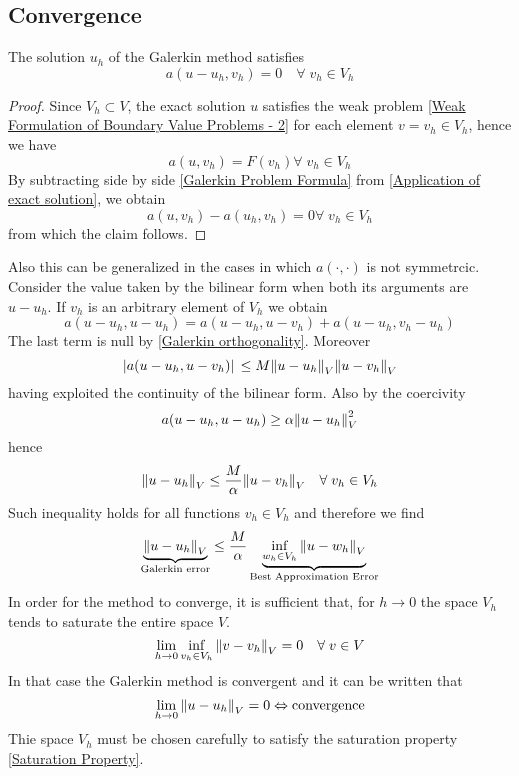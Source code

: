 \subsection*{Convergence}
\begin{lemma}
    The solution \(u_h\) of the Galerkin method satisfies 
    \begin{equation}
        a(u-u_h, v_h) = 0 \quad \forall \; v_h \in V_h \label{Galerkin orthogonality}
    \end{equation}
\end{lemma}
\begin{proof}
    Since \(V_h \subset V\), the exact solution \(u\) satisfies the weak problem \eqref{Weak Formulation of Boundary Value Problems - 2} for each element \(v = v_h \in V_h\), hence we have 
    \begin{equation}
        a(u, v_h) = F(v_h) \forall \; v_h \in V_h \label{Application of exact solution}
    \end{equation}
    By subtracting side by side \eqref{Galerkin Problem Formula} from \eqref{Application of exact solution}, we obtain 
    \[
        a(u,v_h)-a(u_h, v_h) = 0 \forall \; v_h \in V_h
    \]
    from which the claim follows.
\end{proof}
Also this can be generalized in the cases in which \(a(\cdot, \cdot)\) is not symmetrcic. Consider the value taken by the bilinear form when both its arguments are \(u-u_h\). If \(v_h\) is an arbitrary element of \(V_h\) we obtain 
\[
    a(u-u_h, u-u_h) = a(u-u_h, u-v_h) + a(u-u_h, v_h-u_h)
\]
The last term is null by \eqref{Galerkin orthogonality}. Moreover 
\[
    \abs*{a(u-u_h, u-v_h)} \leq M \norm{u-u_h}_V\norm{u-v_h}_V
\]
having exploited the continuity of the bilinear form. Also by the coercivity 
\[
    a(u-u_h, u-u_h) \geq \alpha \norm{u-u_h}^2_V
\]
hence 
\[
    \norm{u-u_h}_V \leq \frac{M}{\alpha} \norm{u-v_h}_V \quad \forall\; v_h \in V_h
\]
Such inequality holds for all functions \(v_h \in V_h\) and therefore we find 
\begin{equation}
   \underbrace{ \norm{u-u_h}_V}_{\text{Galerkin error}} \leq \frac{M}{\alpha} \underbrace{\inf_{w_h \in V_h} \norm{u - w_h}_V}_{\text{Best Approximation Error}} \label{Ceà Lemma}
\end{equation}
In order for the method to converge, it is sufficient that, for \(h \to 0\) the space \(V_h\) tends to saturate the entire space \(V\). 
\begin{equation}
    \lim_{h \to 0} \inf_{v_h \in V_h} \norm{v-v_h}_V= 0 \quad \forall \; v \in V \label{Saturation Property}
\end{equation}
In that case the Galerkin method is convergent and it can be written that
\[
    \lim_{h\to 0} \norm{u-u_h}_V = 0 \Leftrightarrow \text{convergence}
\]
Thie space \(V_h\) must be chosen carefully to satisfy the saturation property \eqref{Saturation Property}.
